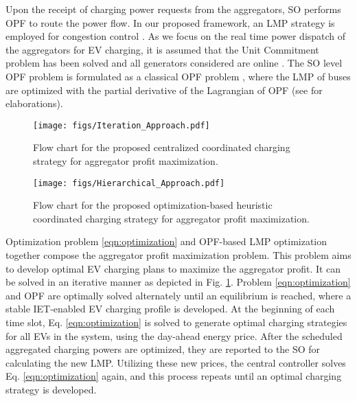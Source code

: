 \documentclass[conference]{IEEEtran}
\begin{document}
	Upon the receipt of charging power requests from the aggregators, SO performs OPF to route the power flow. In our proposed framework, an LMP strategy is employed for congestion control \cite{Wang2014a}. As we focus on the real time power dispatch of the aggregators for EV charging, it is assumed that the Unit Commitment problem has been solved and all generators considered are online \cite{Yao2013}. The SO level OPF problem is formulated as a classical OPF problem \cite{Li2014},
where the LMP of buses are optimized with the partial derivative of the Lagrangian of OPF (see \cite{Li2014,Wang2014a} for elaborations).




	\begin{figure}
		\centering
		\texttt{[image: figs/Iteration\_Approach.pdf]}
        \vspace*{-3mm}
		\caption{Flow chart for the proposed centralized coordinated charging strategy for aggregator profit maximization.}
        \vspace*{-4mm}
		\label{fig:iteration_flowchart}
	\end{figure}
	
	\begin{figure}
		\centering
		\texttt{[image: figs/Hierarchical\_Approach.pdf]}
        \vspace*{-3mm}
		\caption{Flow chart for the proposed optimization-based heuristic coordinated charging strategy for aggregator profit maximization.}
        \vspace*{-6mm}
		\label{fig:flowchart}
	\end{figure}
    
    Optimization problem \eqref{eqn:optimization} and OPF-based LMP optimization together compose the aggregator profit maximization problem. This problem aims to develop optimal EV charging plans to maximize the aggregator profit. It can be solved in an iterative manner as depicted in Fig. \ref{fig:iteration_flowchart}. Problem \eqref{eqn:optimization} and OPF are optimally solved alternately until an equilibrium is reached, where a stable IET-enabled EV charging profile is developed. At the beginning of each time slot, Eq. \eqref{eqn:optimization} is solved to generate optimal charging strategies for all EVs in the system, using the day-ahead energy price.
After the scheduled aggregated charging powers are optimized, they are reported to the SO for calculating the new LMP. Utilizing these new prices, the central controller solves Eq. \eqref{eqn:optimization} again, and this process repeats until an optimal charging strategy is developed.
\end{document}
